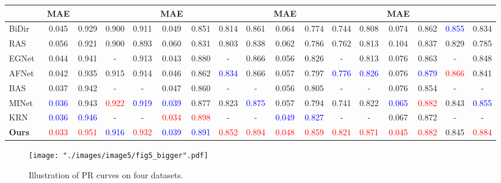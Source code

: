 \documentclass{article}
\begin{document}
\begin{table*}[t]
\begin{tabular}{l|cccc|cccc|cccc|cccc}
    \cline{2-17}
     & MAE &  &  &  
     & MAE &  &  &  
     & MAE &  &  &  
     & MAE &  &  &  \\
     \hline
     \hline
     BiDir~\cite{zhang2018bi}         & 0.045 & 0.929 & 0.900 & 0.911 & 0.049 & 0.851 & 0.814 & 0.861 & 0.064 & 0.774 & 0.744 & 0.808 & 0.074 & 0.862 & \textcolor{blue}{0.855} & 0.834 \\
     RAS~\cite{chen2018reverse}           & 0.056 & 0.921 & 0.900 & 0.893 & 0.060 & 0.831 & 0.803 & 0.838 & 0.062 & 0.786 & 0.762 & 0.813 & 0.104 & 0.837 & 0.829 & 0.785 \\
     EGNet~\cite{zhao2019egnet}         & 0.044 & 0.941 & - & 0.913 & 0.043 & 0.880 & - & 0.866 & 0.056 & 0.826 & - & 0.813 & 0.076 & 0.863 & - & 0.848 \\
     AFNet~\cite{feng2019attentive}         & 0.042 & 0.935 & 0.915 & 0.914 & 0.046 & 0.862 & \textcolor{blue}{0.834} & 0.866 & 0.057 & 0.797 & \textcolor{blue}{0.776} & \textcolor{blue}{0.826} & 0.076 & \textcolor{blue}{0.879} & \textcolor{red}{0.866} & 0.841 \\
     BAS~\cite{qin2019basnet}           & 0.037 & 0.942 & - & - & 0.047 & 0.860 & - & - & 0.056 & 0.805 & - & - & 0.076 & 0.854 & - & - \\
     MINet~\cite{pang2020multi}         & \textcolor{blue}{0.036} & 0.943 & \textcolor{red}{0.922} & \textcolor{blue}{0.919} & \textcolor{blue}{0.039} & 0.877 & 0.823 & \textcolor{blue}{0.875} & 0.057 & 0.794 & 0.741 & 0.822 & \textcolor{blue}{0.065} & \textcolor{red}{0.882} & 0.843 & \textcolor{blue}{0.855} \\
     KRN~\cite{xu2021locate}           & \textcolor{blue}{0.036} & \textcolor{blue}{0.946} & - & - & \textcolor{red}{0.034} & \textcolor{red}{0.898} & - & - & \textcolor{blue}{0.049} & \textcolor{blue}{0.827} & - & - & 0.067 & 0.872 & - & - \\
     \hline
     \textbf{Ours} & \textcolor{red}{0.033} & \textcolor{red}{0.951} & \textcolor{blue}{0.916} & \textcolor{red}{0.932} & \textcolor{blue}{0.039} & \textcolor{blue}{0.891} & \textcolor{red}{0.852} & \textcolor{red}{0.894} & \textcolor{red}{0.048} & \textcolor{red}{0.859} & \textcolor{red}{0.821} & \textcolor{red}{0.871} & \textcolor{red}{0.045} & \textcolor{red}{0.882} & 0.845 & \textcolor{red}{0.884} \\
     \hline
     \hline
  \end{tabular}
\end{table*}

\begin{figure*}[t]
	\setlength{\belowcaptionskip}{-10pt}
	\begin{center}
		\texttt{[image: "./images/image5/fig5\_bigger".pdf]}
	\end{center}
	\vspace{-0.5cm}
	\caption{Illustration of PR curves on four datasets.}
	\label{fig:5}
\end{figure*}
\end{document}
